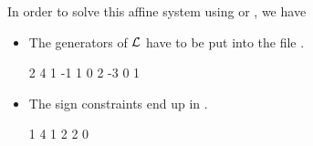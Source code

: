 In order to solve this affine system using  or
, we have

\begin{itemize}
\item The generators of $\mathcal{L}$ have to be put into the file .
\begin{myverbatim}
2 4
1 -1 1 0
2 -3 0 1
\end{myverbatim}
\item The sign constraints end up in .
\begin{myverbatim}
1 4
1 2 2 0
\end{myverbatim}
\end{itemize}
